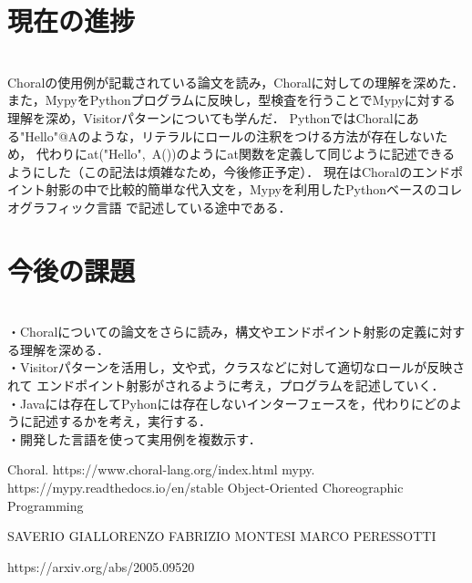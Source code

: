 \documentclass[11pt]{jarticle}
\begin{document}


\section{現在の進捗}\mbox{}\\
Choralの使用例が記載されている論文\cite{choreography}を読み，Choralに対しての理解を深めた．
また，MypyをPythonプログラムに反映し，型検査を行うことでMypyに対する理解を深め，Visitorパターンについても学んだ．
PythonではChoralにある"Hello"@Aのような，リテラルにロールの注釈をつける方法が存在しないため，
代わりにat("Hello",~A())のようにat関数を定義して同じように記述できるようにした（この記法は煩雑なため，今後修正予定）．
現在はChoralのエンドポイント射影の中で比較的簡単な代入文を，Mypyを利用したPythonベースのコレオグラフィック言語
で記述している途中である．

%
%
\newpage
\section{今後の課題}\mbox{}\\
・Choralについての論文をさらに読み，構文やエンドポイント射影の定義に対する理解を深める．
\\
・Visitorパターンを活用し，文や式，クラスなどに対して適切なロールが反映されて
エンドポイント射影がされるように考え，プログラムを記述していく．
\\
・Javaには存在してPyhonには存在しないインターフェースを，代わりにどのように記述するかを考え，実行する．
\\
・開発した言語を使って実用例を複数示す．

\begin{thebibliography}{99}
   Choral.    https://www.choral-lang.org/index.html
   mypy.   https://mypy.readthedocs.io/en/stable
  Object-Oriented Choreographic Programming
  
  SAVERIO GIALLORENZO FABRIZIO MONTESI MARCO PERESSOTTI

  https://arxiv.org/abs/2005.09520
\end{thebibliography}
\end{document}
